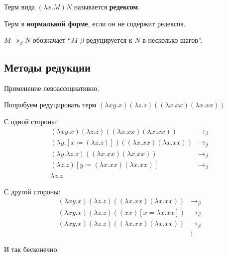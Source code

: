 \begin{definition}
    Терм вида \((\lambda x.M)N\) называется \textbf{редексом}.
\end{definition}
\begin{definition}
    Терм в \textbf{нормальной форме}, если он не содержит редексов.
\end{definition}

\begin{notation}
    \(M \twoheadrightarrow_\beta N\) обозначает ``\(M\) \(\beta\)-редуцируется к \(N\) в несколько шагов''.
\end{notation}

\? %

\subsection{Методы редукции}

\begin{remark}
    Применение левоассоциативно.
\end{remark}

\begin{example}
    Попробуем редуцировать терм \((\lambda xy.x)(\lambda z.z)((\lambda x.x x)(\lambda x.x x))\)

    С одной стороны:
    \begin{align*}
        (\lambda xy.x)(\lambda z.z)((\lambda x.x x)(\lambda x.x x))             & \to_\beta \\
        (\lambda y.[x \coloneqq (\lambda z.z)])((\lambda x.x x)(\lambda x.x x)) & \to_\beta \\
        (\lambda y.\lambda z.z)((\lambda x.x x)(\lambda x.x x))                 & \to_\beta \\
        (\lambda z.z)[y \coloneqq (\lambda x.x x)(\lambda x.x x)]               & \to_\beta \\
        \lambda z.z
    \end{align*}

    С другой стороны:
    \begin{align*}
        (\lambda xy.x)(\lambda z.z)((\lambda x.x x)(\lambda x.x x)) & \to_\beta \\
        (\lambda xy.x)(\lambda z.z)((x x)[x = \lambda x.x x])       & \to_\beta \\
        (\lambda xy.x)(\lambda z.z)((\lambda x.x x)(\lambda x.x x)) & \to_\beta \\
                                                                    & \vdots
    \end{align*}

    И так бесконечно.
\end{example}

